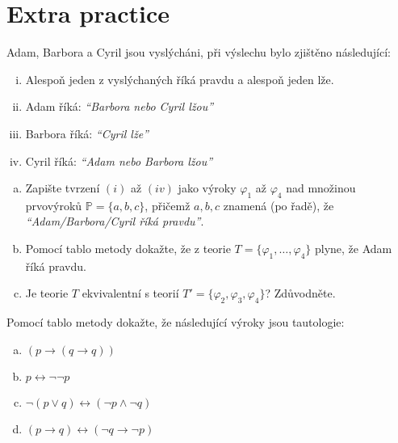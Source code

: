         
\section*{Extra practice}


\begin{problem}

    Adam, Barbora a Cyril jsou vyslýcháni, při výslechu bylo zjištěno následující:
    \begin{enumerate}[(i)]\it
        \item Alespoň jeden z vyslýchaných říká pravdu a alespoň jeden lže.
        \item Adam říká: \emph{``Barbora nebo Cyril lžou''}
        \item Barbora říká: \emph{``Cyril lže''}
        \item Cyril říká: \emph{``Adam nebo Barbora lžou''}
    \end{enumerate}
    \begin{enumerate}[(a)]
        \item Zapište tvrzení $(i)$ až $(iv)$ jako výroky $\varphi_1$ až $\varphi_4$ nad množinou prvovýroků $\mathbb{P}=\{a,b,c\}$, přičemž $a,b,c$ znamená (po řadě), že {\it ``Adam/Barbora/Cyril říká pravdu''}.
        \item Pomocí tablo metody dokažte, že z teorie $T = \{\varphi_1, \dots, \varphi_4\}$ plyne, že Adam říká pravdu.
        \item Je teorie $T$ ekvivalentní s teorií $T' = \{\varphi_2, \varphi_3, \varphi_4\}$? Zdůvodněte.    
    \end{enumerate}
    
\end{problem}
        

\begin{problem}

    Pomocí tablo metody dokažte, že následující výroky jsou tautologie:
    \begin{enumerate}[(a)]
        \item $(p\to (q \to q))$
        \item $p \leftrightarrow \neg \neg  p$
        \item $\neg (p \vee q) \leftrightarrow (\neg p \wedge \neg q)$
        \item $(p \to q) \leftrightarrow (\neg q \to \neg p)$    
    \end{enumerate}

\end{problem} 
   

